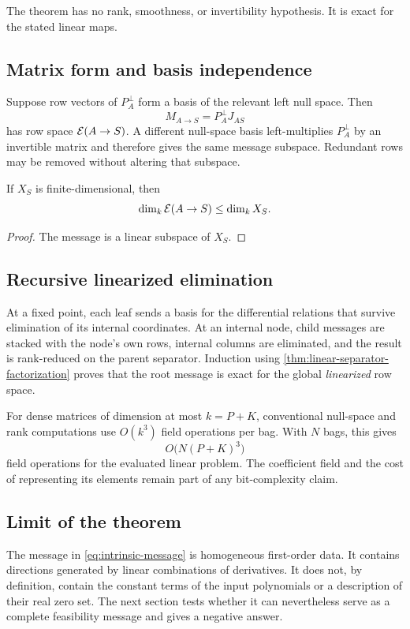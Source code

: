 The theorem has no rank, smoothness, or invertibility hypothesis.  It is exact
for the stated linear maps.

\subsection{Matrix form and basis independence}

Suppose row vectors of \(P_A^\perp\) form a basis of the relevant left null
space.  Then
\begin{equation}
  M_{A\to S}=P_A^\perp J_{AS}
  \label{eq:matrix-message}
\end{equation}
has row space \(\mathcal{E}(A\to S)\).  A different null-space basis left-multiplies
\(P_A^\perp\) by an invertible matrix and therefore gives the same message
subspace.  Redundant rows may be removed without altering that subspace.

\begin{proposition}
\label{prop:message-dimension}
If \(X_S\) is finite-dimensional, then
\begin{equation}
  \dim_k\mathcal{E}(A\to S)\le\dim_kX_S.
\end{equation}
\end{proposition}

\begin{proof}
The message is a linear subspace of \(X_S\).
\end{proof}

\subsection{Recursive linearized elimination}

At a fixed point, each leaf sends a basis for the differential relations that
survive elimination of its internal coordinates.  At an internal node, child
messages are stacked with the node's own rows, internal columns are eliminated,
and the result is rank-reduced on the parent separator.  Induction using
\cref{thm:linear-separator-factorization} proves that the root message is exact
for the global \emph{linearized} row space.

For dense matrices of dimension at most \(k=P+K\), conventional null-space and
rank computations use \(O(k^3)\) field operations per bag.  With \(N\) bags,
this gives
\begin{equation}
  O\bigl(N(P+K)^3\bigr)
  \label{eq:cmp-arithmetic-count}
\end{equation}
field operations for the evaluated linear problem.  The coefficient field and
the cost of representing its elements remain part of any bit-complexity claim.

\subsection{Limit of the theorem}

The message in \cref{eq:intrinsic-message} is homogeneous first-order data.  It
contains directions generated by linear combinations of derivatives.  It does
not, by definition, contain the constant terms of the input polynomials or a
description of their real zero set.  The next section tests whether it can
nevertheless serve as a complete feasibility message and gives a negative
answer.
